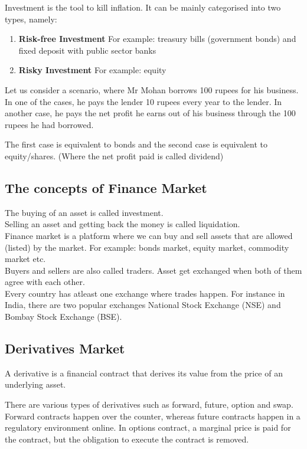 \documentclass{report}
\begin{document}
Investment is the tool to kill inflation.
It can be mainly categorised into two types, namely:
\begin{enumerate}
    \item \textbf{Risk-free Investment} For example: treasury bills (government bonds) and fixed deposit with public sector banks
    \item \textbf{Risky Investment} For example: equity
\end{enumerate}



Let us consider a scenario, where Mr Mohan borrows 100 rupees for his business. In one of the cases, he pays the lender 10 rupees every year to the lender. In another case, he pays the net profit he earns out of his business through the 100 rupees he had borrowed.

The first case is equivalent to bonds and the second case is equivalent to equity/shares. (Where the net profit paid is called dividend)

\subsection{The concepts of Finance Market}
The buying of an asset is called investment.\\Selling an asset and getting back the money is called liquidation.\\Finance market is a platform where we can buy and sell assets that are allowed (listed) by the market. For example: bonds market, equity market, commodity market etc.\\Buyers and sellers are also called traders. Asset get exchanged when both of them agree with each other.\\Every country has atleast one exchange where trades happen. For instance in India, there are two popular exchanges National Stock Exchange (NSE) and Bombay Stock Exchange (BSE).


\subsection{Derivatives Market}
A derivative is a financial contract that derives its value from the price of an underlying asset.


There are various types of derivatives such as forward, future, option and swap. Forward contracts happen over the counter, whereas future contracts happen in a regulatory environment online. In options contract, a marginal price is paid for the contract, but the obligation to execute the contract is removed.
\end{document}
